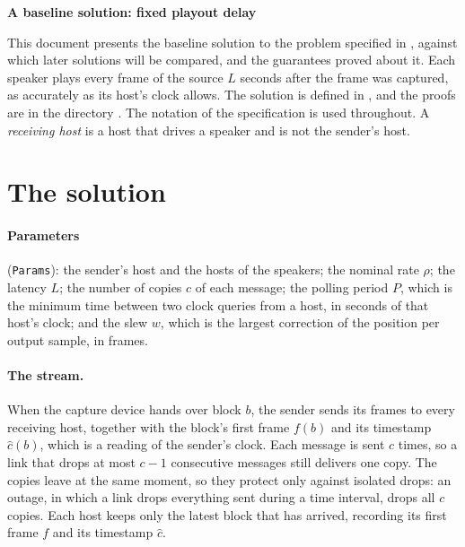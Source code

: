 \documentclass[11pt,a4paper]{article}
\newcommand{\lean}[1]{\texttt{#1}}
\theoremstyle{definition}
\begin{document}
\begin{center}
{\LARGE\bfseries A baseline solution: fixed playout delay\par}
\end{center}
\medskip

This document presents the baseline solution to the problem specified in
, against which later solutions will be
compared, and the guarantees proved about it. Each speaker plays every frame
of the source $L$ seconds after the frame was captured, as accurately as its
host's clock allows. The solution is defined in
, and the proofs are in the
directory . The notation of the
specification is used throughout. A \emph{receiving host} is a host that
drives a speaker and is not the sender's host.

\section{The solution}

\paragraph{Parameters} (\lean{Params}): the sender's host and the hosts of
the speakers; the nominal rate $\rho$; the latency $L$; the number of copies
$c$ of each message; the polling period $P$, which is the minimum time
between two clock queries from a host, in seconds of that host's clock; and
the slew $w$, which is the largest correction of the position per output
sample, in frames.

\paragraph{The stream.} When the capture device hands over block $b$, the
sender sends its frames to every receiving host, together with the block's
first frame $f(b)$ and its timestamp $\hat c(b)$, which is a reading of the
sender's clock. Each message is sent $c$ times, so a link that drops at most
$c - 1$ consecutive messages still delivers one copy. The copies leave at
the same moment, so they protect only against isolated drops: an outage, in
which a link drops everything sent during a time interval, drops all $c$
copies. Each host keeps only the latest block that has arrived, recording
its first frame $f$ and its timestamp $\hat c$.
\end{document}
